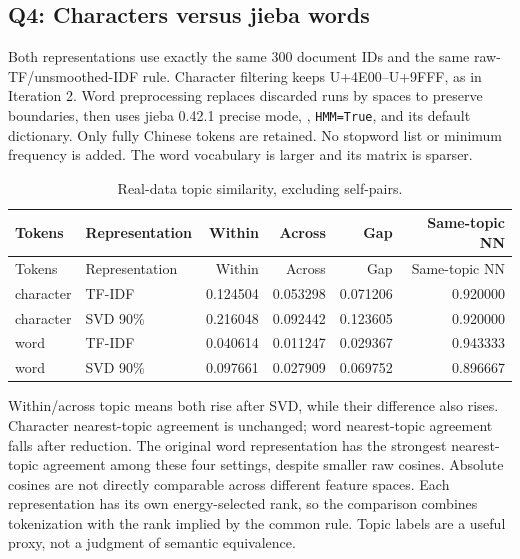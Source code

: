 \documentclass[11pt]{article}
\renewcommand{\arraystretch}{1.15}
\begin{document}
\subsection{Q4: Characters versus jieba words}
Both representations use exactly the same 300 document IDs and the same
raw-TF/unsmoothed-IDF rule. Character filtering keeps U+4E00--U+9FFF,
as in Iteration 2. Word preprocessing replaces discarded runs by spaces
to preserve boundaries, then uses jieba 0.42.1 precise mode,
, \texttt{HMM=True}, and its default dictionary.
Only fully Chinese tokens are retained. No stopword list or minimum
frequency is added. The word vocabulary is larger and its matrix is sparser.
{\small\renewcommand{\arraystretch}{1.05}
\begin{longtable}{llrrrr}
\caption{Real-data topic similarity, excluding self-pairs.}\\
\toprule
Tokens & Representation & Within & Across & Gap & Same-topic NN \\ \midrule\endfirsthead
\toprule
Tokens & Representation & Within & Across & Gap & Same-topic NN \\ \midrule\endhead
character & TF-IDF & 0.124504 & 0.053298 & 0.071206 & 0.920000 \\
character & SVD 90\% & 0.216048 & 0.092442 & 0.123605 & 0.920000 \\
word & TF-IDF & 0.040614 & 0.011247 & 0.029367 & 0.943333 \\
word & SVD 90\% & 0.097661 & 0.027909 & 0.069752 & 0.896667 \\
\bottomrule
\end{longtable}
}

Within/across topic means both rise after SVD, while their difference
also rises. Character nearest-topic agreement is unchanged; word
nearest-topic agreement falls after reduction.
The original word representation has the strongest nearest-topic
agreement among these four settings, despite smaller raw cosines.
Absolute cosines are not directly comparable across different feature
spaces. Each representation has its own energy-selected rank, so the
comparison combines tokenization with the rank implied by the common rule.
Topic labels are a useful proxy, not a judgment of semantic equivalence.
\end{document}
